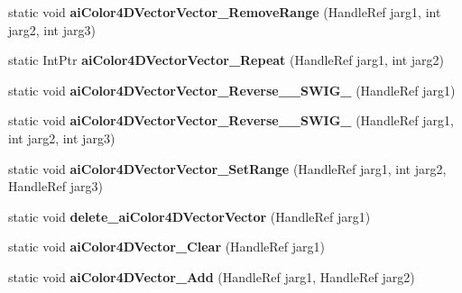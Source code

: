 \begin{DoxyCompactItemize}
\item 
\hypertarget{class_assimp_p_i_n_v_o_k_e_a3436c1b205b71400fd9bb2cd6f2ef1f1}{static void {\bfseries ai\+Color4\+D\+Vector\+Vector\+\_\+\+Remove\+Range} (Handle\+Ref jarg1, int jarg2, int jarg3)}\label{class_assimp_p_i_n_v_o_k_e_a3436c1b205b71400fd9bb2cd6f2ef1f1}

\item 
\hypertarget{class_assimp_p_i_n_v_o_k_e_a1c62766bd00c25afa6691a1d4991429f}{static Int\+Ptr {\bfseries ai\+Color4\+D\+Vector\+Vector\+\_\+\+Repeat} (Handle\+Ref jarg1, int jarg2)}\label{class_assimp_p_i_n_v_o_k_e_a1c62766bd00c25afa6691a1d4991429f}

\item 
\hypertarget{class_assimp_p_i_n_v_o_k_e_ad31e18f8249279b88655a6fe7209a0dd}{static void {\bfseries ai\+Color4\+D\+Vector\+Vector\+\_\+\+Reverse\+\_\+\+\_\+\+S\+W\+I\+G\+\_} (Handle\+Ref jarg1)}\label{class_assimp_p_i_n_v_o_k_e_ad31e18f8249279b88655a6fe7209a0dd}

\item 
\hypertarget{class_assimp_p_i_n_v_o_k_e_af37804129195f641c481ed056ed610b6}{static void {\bfseries ai\+Color4\+D\+Vector\+Vector\+\_\+\+Reverse\+\_\+\+\_\+\+S\+W\+I\+G\+\_} (Handle\+Ref jarg1, int jarg2, int jarg3)}\label{class_assimp_p_i_n_v_o_k_e_af37804129195f641c481ed056ed610b6}

\item 
\hypertarget{class_assimp_p_i_n_v_o_k_e_ac0b213778069306fcb09d318804c4d06}{static void {\bfseries ai\+Color4\+D\+Vector\+Vector\+\_\+\+Set\+Range} (Handle\+Ref jarg1, int jarg2, Handle\+Ref jarg3)}\label{class_assimp_p_i_n_v_o_k_e_ac0b213778069306fcb09d318804c4d06}

\item 
\hypertarget{class_assimp_p_i_n_v_o_k_e_a0c787d57f1334ce2260ad291f15d481a}{static void {\bfseries delete\+\_\+ai\+Color4\+D\+Vector\+Vector} (Handle\+Ref jarg1)}\label{class_assimp_p_i_n_v_o_k_e_a0c787d57f1334ce2260ad291f15d481a}

\item 
\hypertarget{class_assimp_p_i_n_v_o_k_e_a4a97cc2fa6ff13b07a21e684404697d0}{static void {\bfseries ai\+Color4\+D\+Vector\+\_\+\+Clear} (Handle\+Ref jarg1)}\label{class_assimp_p_i_n_v_o_k_e_a4a97cc2fa6ff13b07a21e684404697d0}

\item 
\hypertarget{class_assimp_p_i_n_v_o_k_e_acdc8f1797dacbee7e7729ad350c62898}{static void {\bfseries ai\+Color4\+D\+Vector\+\_\+\+Add} (Handle\+Ref jarg1, Handle\+Ref jarg2)}\label{class_assimp_p_i_n_v_o_k_e_acdc8f1797dacbee7e7729ad350c62898}


\end{DoxyCompactItemize}
